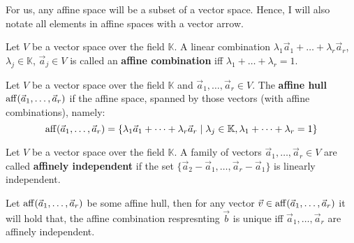 For us, any affine space will be a subset of a vector space. Hence, I will also notate all elements in affine spaces with a vector arrow. 

\begin{definition}
    Let $V$ be a vector space over the field $\mathbb{K}$. A linear combination $\lambda_1 \vec a_1 + \dots + \lambda_r \vec a_r$, $\lambda_j \in \mathbb{K}$, $\vec a_j \in V$ is called an \textbf{affine combination} iff $\lambda_1 + \dots + \lambda_r = 1$.
\end{definition}
    
\begin{definition}
    Let $V$ be a vector space over the field $\mathbb{K}$ and $\vec a_1, \dots, \vec a_r \in V$. The \textbf{affine hull} $\operatorname{aff}(\vec a_1, \dots, \vec a_r)$ if the affine space, spanned by those vectors (with affine combinations), namely:
    $$\operatorname{aff}(\vec a_1, \dots, \vec a_r) = \{\lambda_1 \vec a_1 + \dots + \lambda_r \vec a_r \mid \lambda_j \in \mathbb{K}, \lambda_1 + \dots + \lambda_r = 1\}$$
\end{definition}
\begin{definition}
    Let $V$ be a vector space over the field $\mathbb{K}$. A family of vectors $\vec a_1, \dots, \vec a_r \in V$ are called \textbf{affinely independent} if the set $\{\vec a_2 - \vec a_1, \dots, \vec a_r - \vec a_1\}$ is linearly independent.
\end{definition}
\begin{observation}
    \label{obs:aff_combi_unique}
    Let $\operatorname{aff}(\vec a_1, \dots, \vec a_r)$ be some affine hull, then for any vector $\vec v \in \operatorname{aff}(\vec a_1, \dots, \vec a_r)$ it will hold that, the affine combination respresnting $\vec b$ is unique iff $\vec a_1, \dots, \vec a_r$ are affinely independent.
\end{observation}

